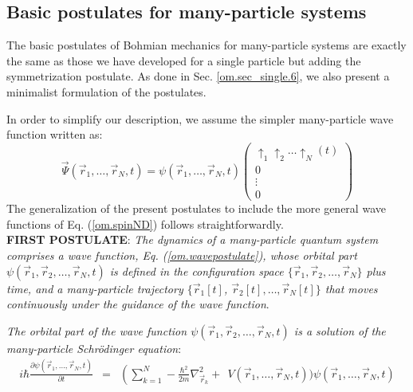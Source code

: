 \documentclass[nofootinbib, secnumarabic, amsmath, nobibnotes,10pt,aps,pra]{revtex4-1}
\newcommand{\sref}[1]{Sec. \ref{#1}}
\newcommand{\eref}[1]{Eq. (\ref{#1})}
\begin{document}
\subsection{Basic postulates  for many-particle systems}\label{om.sec_many.5}

The basic postulates of Bohmian mechanics for many-particle systems are exactly the same as those we have developed for a single particle but adding the symmetrization postulate. As done in \sref{om.sec_single.6}, we also present a minimalist formulation of the postulates.

\enlargethispage{-1pc}
In order to simplify our description, we assume the simpler many-particle wave function written as:
\begin{equation}
\label{om.wavepostulate}
\vec \Psi(\vec r_1,\ldots,\vec r_N,t) = \psi(\vec r_1,\ldots,\vec r_N,t)\left(
\begin{array}{c}
\uparrow_1 \uparrow_2\ldots\uparrow_N(t) \\ 0 \\ \vdots \\ 0
\end{array}
\right)
\end{equation}
The generalization of the present postulates to include the more general wave functions of \eref{om.spinND} follows straightforwardly. \\


\noindent\textbf{FIRST POSTULATE}: \textit{The dynamics of a many-particle quantum  system comprises a wave function,
\eref{om.wavepostulate}, whose orbital  part $\psi(\vec r_1,\vec r_2,\ldots,\vec r_N,t)$ is defined in the configuration space 
$\{\vec r_1,\vec r_2,\ldots,\vec r_N\}$ plus time, and a many-particle trajectory $\{\vec r_1[t]$, $\vec r_2[t],\ldots,\vec r_N[t]\}$ that moves continuously under the guidance of the wave function}.

\textit{The orbital part of the wave function $\psi(\vec r_1,\vec r_2,\ldots,\vec r_N,t)$ is a solution of the many-particle Schr\"odinger equation}:
\begin{eqnarray*}
i \hbar \frac{\partial \psi(\vec r_{1},\ldots,\vec
r_{N},t)}{\partial t} &=& \left( \sum_{k = 1}^N -\frac{\hbar^2}{2m}
\nabla^2_{\vec r_k} \right.+\ \ V(\vec r_{1},\ldots,\vec r_{N},t) \Bigg)
\psi(\vec r_{1},\ldots,\vec r_{N},t)
\end{eqnarray*}
\end{document}
